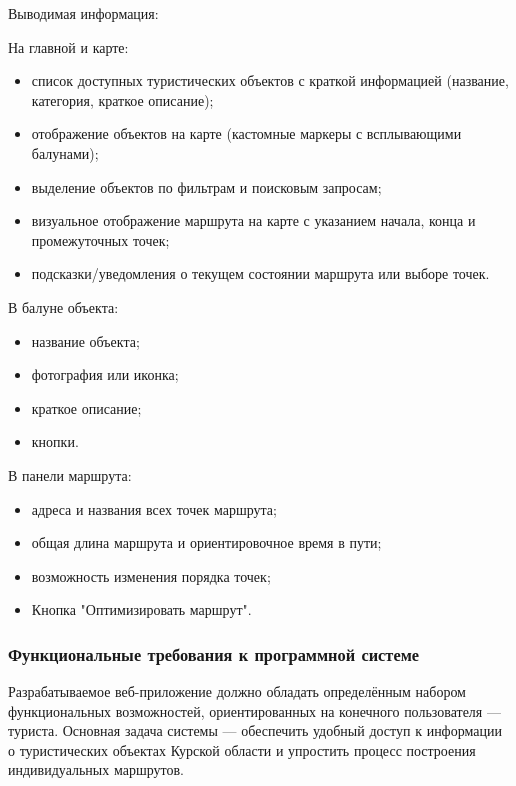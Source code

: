 Выводимая информация:

На главной и карте:
\begin{itemize}
	\item список доступных туристических объектов с краткой информацией\cite{b6} (название, категория, краткое описание);
	\item отображение объектов на карте (кастомные маркеры с всплывающими балунами);
	\item выделение объектов по фильтрам и поисковым запросам;
	\item визуальное отображение маршрута на карте с указанием начала, конца и промежуточных точек;
	\item подсказки/уведомления о текущем состоянии маршрута или выборе точек.
\end{itemize}

В балуне объекта:
\begin{itemize}
	\item название объекта;
	\item фотография или иконка;
	\item краткое описание;
	\item кнопки.
\end{itemize}

В панели маршрута:
\begin{itemize}
	\item адреса и названия всех точек маршрута;
	\item общая длина маршрута и ориентировочное время в пути;
	\item возможность изменения порядка точек;
	\item Кнопка "Оптимизировать маршрут".
\end{itemize}

\subsubsection{Функциональные требования к программной системе}

Разрабатываемое веб-приложение должно обладать определённым набором функциональных возможностей, ориентированных на конечного пользователя — туриста. Основная задача системы — обеспечить удобный доступ к информации о туристических объектах Курской области и упростить процесс построения индивидуальных маршрутов\cite{b7}.

